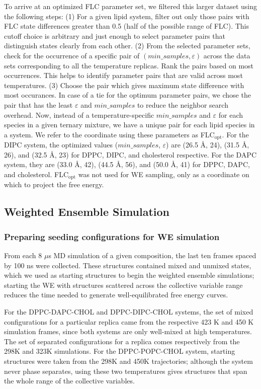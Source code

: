 \documentclass{biophys-new}
\begin{document}
To arrive at an optimized FLC parameter set, we filtered this larger dataset using the following steps:
(1) For a given lipid system, filter out only those pairs with FLC state differences greater than 0.5 (half of the possible range of FLC).
This cutoff choice is arbitrary and just enough to select parameter pairs that distinguish states clearly from each other.
(2) From the selected parameter sets, check for the occurrence of a specific pair of $(min\_samples, \varepsilon)$ across the data sets corresponding to all the temperature replicas.
Rank the pairs based on most occurrences. This helps to identify parameter pairs that are valid across most temperatures.
(3) Choose the pair which gives maximum state difference with most occurances. In case of a tie for the optimum parameter pairs, we chose the pair that has the least $\varepsilon$ and $min\_samples$ to reduce the neighbor search overhead.
Now, instead of a temperature-specific $min\_samples$ and $\varepsilon$ for each species in a given ternary mixture, we have a unique pair for each lipid species in a system. We refer to the coordinate using these parameters as FLC$_{\text{opt}}$. For the DIPC system, the optimized values ($min\_samples$, $\varepsilon$) are (26.5 {\AA}, 24), (31.5 {\AA}, 26), and (32.5 {\AA}, 23) for DPPC, DIPC, and cholesterol respective. For the DAPC system, they are (33.0 {\AA}, 42), (44.5 {\AA}, 56), and (50.0 {\AA}, 41) for DPPC, DAPC, and cholesterol. FLC$_{\text{opt}}$ was not used for WE sampling, only as a coordinate on which to project the free energy.

\subsection*{Weighted Ensemble Simulation}

\subsubsection*{Preparing seeding configurations for WE simulation}
From each 8 $\mu$s MD simulation of a given composition, the last ten frames spaced by 100 ns were collected.
These structures contained mixed and unmixed states, which we used as starting structures to begin the weighted ensemble simulations; starting the WE with structures scattered across the collective variable range reduces the time needed to generate well-equilibrated free energy curves.

For the DPPC-DAPC-CHOL and DPPC-DIPC-CHOL systems, the set of mixed configurations for a particular replica came from the respective 423 K and 450 K simulation frames, since both systems are only well-mixed at high temperatures.
The set of separated configurations for a replica comes respectively from the 298K and 323K simulations.
For the DPPC-POPC-CHOL system, starting structures were taken from the 298K and 450K trajectories; although the system never phase separates, using these two temperatures gives structures that span the whole range of the collective variables.
\end{document}
